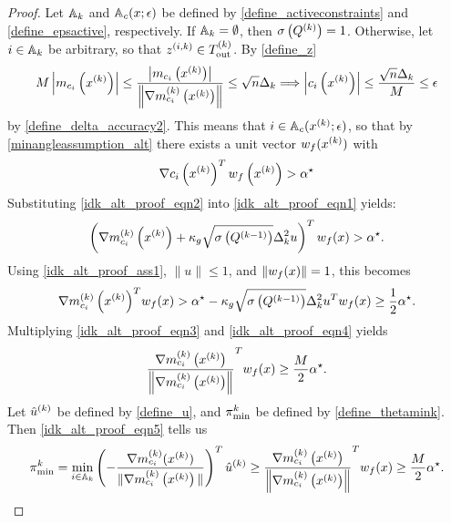 \begin{proof}
Let ${\mathbb A_{k}}$ and ${\mathbb A_c}(x; \epsilon)$
be defined by
\cref{define_activeconstraints} and \cref{define_epsactive},
respectively.
If ${\mathbb A_{k}} = \emptyset$, then $\sigma\left({Q^{(k)}}\right) = 1$.
Otherwise, let $i \in {\mathbb A_{k}}$ be arbitrary,
so that ${z^{(i, k)}} \in {T_{\text{out}}^{(k)}}$. By \cref{define_z}
\begin{align*}
M \left|m_{c_i}\left(x^{(k)}\right)\right| \le \frac{\left|m_{c_i}\left(x^{(k)}\right)\right|}{\left\|{\nabla m_{c_i}^{(k)}\left(x^{(k)}\right)}\right\|} \le \sqrt{n} \Delta_k \Longrightarrow
\left|c_i\left(x^{(k)}\right)\right| \le \frac{\sqrt{n}\Delta_k}{M} \le \epsilon
\end{align*}
by \cref{define_delta_accuracy2}.
This means that $i \in {\mathbb A_c}(x^{(k)}; \epsilon)$, so that by \cref{minangleassumption_alt} there exists a unit vector ${w_f}(x^{(k)})$ with
\begin{align}
\nabla c_i\left(x^{(k)}\right)^T{w_f}\left(x^{(k)}\right) > { \alpha^{\star} } \label{idk_alt_proof_eqn1}
\end{align}
Substituting \cref{idk_alt_proof_eqn2} into \cref{idk_alt_proof_eqn1} yields:
\begin{align*}
\left({\nabla m_{c_i}^{(k)}\left(x^{(k)}\right)} + \kappa_g \sqrt{\sigma\left( Q^{(k-1)} \right)}\Delta_k^2 u\right)^T {w_f}(x) > { \alpha^{\star} }.
\end{align*}
Using \cref{idk_alt_proof_ass1}, $\|u\|\le 1$, and $\|{w_f}(x)\| = 1$, this becomes
\begin{align}
{\nabla m_{c_i}^{(k)}\left(x^{(k)}\right)}^T{w_f}(x) 
> { \alpha^{\star} } - \kappa_g \sqrt{\sigma\left( Q^{(k-1)} \right)}\Delta_k^2 u^T{w_f}(x) 
\ge \frac 1 2 { \alpha^{\star} }. \label{idk_alt_proof_eqn3}
\end{align}
Multiplying \cref{idk_alt_proof_eqn3} and \cref{idk_alt_proof_eqn4} yields
\begin{align}
\frac{{\nabla m_{c_i}^{(k)}\left(x^{(k)}\right)}}{\left\|{\nabla m_{c_i}^{(k)}\left(x^{(k)}\right)}\right\|}^T  {w_f}(x) \ge \frac M 2 { \alpha^{\star} }. \label{idk_alt_proof_eqn5}
\end{align}
Let ${{\hat u}^{(k)}}$ be defined by \cref{define_u}, 
and ${\pi^k_{\textrm{min}}}$ be defined by \cref{define_thetamink}.
Then \cref{idk_alt_proof_eqn5} tells us 
\begin{align*}
{\pi^k_{\textrm{min}}} = \min_{i \in {\mathbb A_{k}}} \left(-{\frac{\nabla m^{(k)}_{c_i}(x^{(k)})}{\|\nabla m^{(k)}_{c_i}\left(x^{(k)}\right)\|}}\right)^T {{\hat u}^{(k)}} \ge \frac{{\nabla m_{c_i}^{(k)}\left(x^{(k)}\right)}}{\left\|{\nabla m_{c_i}^{(k)}\left(x^{(k)}\right)}\right\|}^T {w_f}(x) \ge \frac M 2 { \alpha^{\star} }.
\end{align*}


\end{proof}
